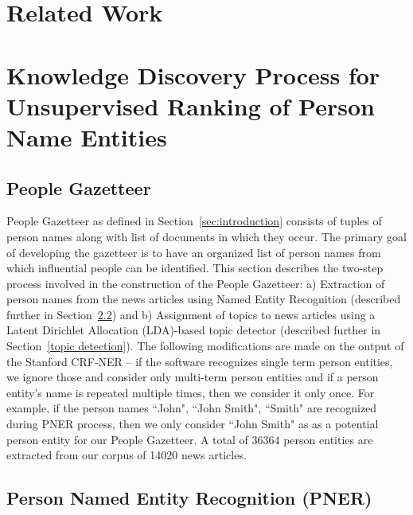 \documentclass[a4paper,man,natbib]{apa6}
\begin{document}
\section{Related Work}






\section{Knowledge Discovery Process for Unsupervised Ranking of Person Name Entities}

\subsection{People Gazetteer}
People Gazetteer as defined in Section~\ref{sec:introduction} consists of tuples of person names along with list of documents in which they occur. The primary goal of developing the gazetteer is to have an organized list of person names from which influential people can be identified.
This section describes the two-step process involved in the construction of the People Gazetteer:
a) Extraction of person names from the news articles using Named Entity Recognition (described further in Section~\ref{ner}) and
b) Assignment of topics to news articles using a Latent Dirichlet Allocation (LDA)-based topic detector (described further in  Section~\ref{topic detection}). The following modifications are made on the output of the Stanford CRF-NER -- if the software recognizes single term person entities, we ignore those and consider only multi-term person entities and if a person entity's name is repeated multiple times, then we consider it only once. For example, if the person names ``John", ``John Smith", ``Smith" are recognized during PNER process, then we only consider ``John Smith" as as a potential person entity for our People Gazetteer.  
A total of 36364 person entities are extracted from our corpus of 14020 news articles.  


\subsection{Person Named Entity Recognition (PNER)}
\label{ner}
\end{document}
